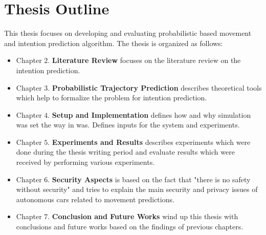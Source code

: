 \section{Thesis Outline}

This thesis focuses on developing and evaluating probabilistic based movement and intention prediction algorithm. The thesis is organized as follows:

\begin{itemize}
	\item Chapter $2$. \textbf{Literature Review} focuses on the literature review on the intention prediction.
	\item Chapter $3$. \textbf{Probabilistic Trajectory Prediction} describes theoretical tools which help to formalize the problem for intention prediction.
	\item Chapter $4$. \textbf{Setup and Implementation} defines how and why simulation was set the way in was. Defines inputs for the system and experiments.	
	\item Chapter $5$. \textbf{Experiments and Results} describes experiments which were done during the thesis writing period and evaluate results which were received by performing various experiments.
	\item Chapter $6$. \textbf{Security Aspects} is based on the fact that "there is no safety without security" and tries to explain the main security and privacy issues of autonomous cars related to movement predictions.
	\item Chapter $7$. \textbf{Conclusion and Future Works} wind up this thesis with conclusions and future works based on the findings of previous chapters.
\end{itemize}